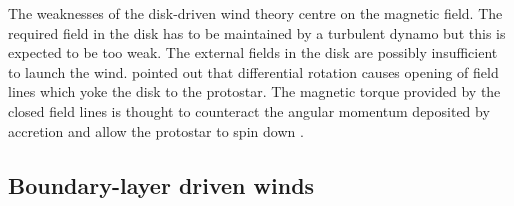 
The weaknesses of the disk-driven wind theory centre on the magnetic field.
The required field in the disk has to be maintained by a turbulent dynamo but this is expected to be too weak.
The external fields in the disk are possibly insufficient to launch the wind.
\citet{2002ApJ...574..232M,2004ApJ...607L..43M,2005MNRAS.356..167M} pointed out that differential rotation causes opening of field lines which yoke the disk to the protostar. 
The magnetic torque provided by the closed field lines is thought to counteract the angular momentum deposited by accretion and allow the protostar to spin down \citep{1991ApJ...370L..39K}.


\subsection{Boundary-layer driven winds}


